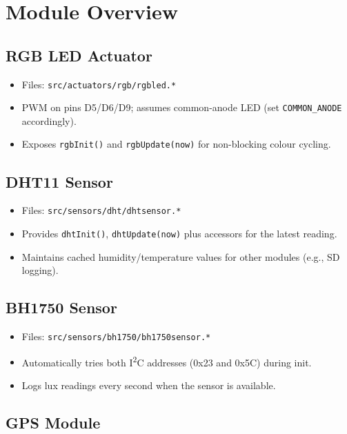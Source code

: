 \documentclass[11pt,a4paper]{article}
\begin{document}
\section{Module Overview}

\subsection{RGB LED Actuator}

\begin{itemize}
  \item Files: \texttt{src/actuators/rgb/rgbled.*}
  \item PWM on pins D5/D6/D9; assumes common-anode LED (set \texttt{COMMON\_ANODE} accordingly).
  \item Exposes \texttt{rgbInit()} and \texttt{rgbUpdate(now)} for non-blocking colour cycling.
\end{itemize}

\subsection{DHT11 Sensor}

\begin{itemize}
  \item Files: \texttt{src/sensors/dht/dhtsensor.*}
  \item Provides \texttt{dhtInit()}, \texttt{dhtUpdate(now)} plus accessors for the latest reading.
  \item Maintains cached humidity/temperature values for other modules (e.g., SD logging).
\end{itemize}

\subsection{BH1750 Sensor}

\begin{itemize}
  \item Files: \texttt{src/sensors/bh1750/bh1750sensor.*}
  \item Automatically tries both I\textsuperscript{2}C addresses (0x23 and 0x5C) during init.
  \item Logs lux readings every second when the sensor is available.
\end{itemize}

\subsection{GPS Module}
\end{document}
